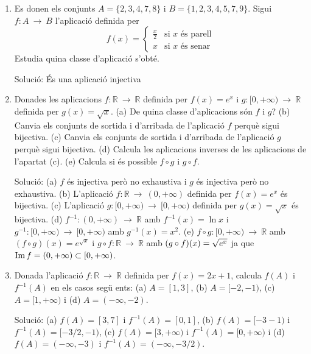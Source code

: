 \begin{enumerate}
\item Es donen els conjunts $A=\{2,3,4,7,8\}$ i $B=\{1,2,3,4,5,7,9\}$. Sigui
$f:A~\longrightarrow ~B$ l'aplicaci\'{o} definida per
\begin{equation*}
f(x)=\left\{
\begin{array}{ll}
\frac{x}{2} & \text{si \ }x\text{ \ \'{e}s parell} \\
x & \text{si \ }x\text{ \ \'{e}s senar}%
\end{array}%
\right.
\end{equation*}%
Estudia quina classe d'aplicaci\'{o} s'obt\'{e}.

Soluci\'{o}: \'{E}s una aplicaci\'{o} injectiva

\item Donades les aplicacions $f:\mathbb{R}~\longrightarrow ~\mathbb{R}$
definida per $f(x)=e^{x}$ i $g:[0,+\infty )~\longrightarrow ~\mathbb{R}$
definida per $g(x)=\sqrt{x}$. (a) De quina classe d'aplicacions s\'{o}n $f$
i $g$? (b) Canvia els conjunts de sortida i d'arribada de l'aplicaci\'{o} $f$
perqu\`{e} sigui bijectiva. (c) Canvia els conjunts de sortida i d'arribada
de l'aplicaci\'{o} $g$ perqu\`{e} sigui bijectiva. (d) Calcula les
aplicacions inverses de les aplicacions de l'apartat (c). (e) Calcula si
\'{e}s possible $f\circ g$ i $g\circ f$.

Soluci\'{o}: (a) $f$ \'{e}s injectiva per\`{o} no exhaustiva i $g$ \'{e}s
injectiva per\`{o} no exhaustiva. (b) L'aplicaci\'{o} $f:\mathbb{R}%
~\longrightarrow ~(0,+\infty )$ definida per $f(x)=e^{x}$ \'{e}s bijectiva.
(c) L'aplicaci\'{o} $g:[0,+\infty )~\longrightarrow ~[0,+\infty )$ definida
per $g(x)=\sqrt{x}$ \'{e}s bijectiva. (d) $f^{-1}:(0,+\infty
)~\longrightarrow ~\mathbb{R}$ amb $f^{-1}(x)=\ln x$ i $g^{-1}:[0,+\infty
)~\longrightarrow ~[0,+\infty )$ amb $g^{-1}(x)=x^{2}$. (e) $f\circ
g:[0,+\infty )~\longrightarrow ~\mathbb{R}$ amb $(f\circ g)(x)=e^{\sqrt{x}}$
i $g\circ f:\mathbb{R}~\longrightarrow ~\mathbb{R}$ amb $(g\circ f)(x)=\sqrt{%
e^{x}}$ ja que $\mathop{\rm Im}\nolimits f=(0,+\infty )\subset \lbrack 0,+\infty )$.

\item Donada l'aplicaci\'{o} $f:\mathbb{R}~\longrightarrow ~\mathbb{R}$
definida per $f(x)=2x+1$, calcula $f(A)$ i $f^{-1}(A)$ en els casos seg\"{u}%
ents: (a) $A=[1,3]$, (b) $A=[-2,-1)$, (c) $A=[1,+\infty )$ i (d) $A=(-\infty
,-2)$.

Soluci\'{o}: (a) $f(A)=[3,7]$ i $f^{-1}(A)=[0,1]$, (b) $f(A)=[-3-1)$ i $%
f^{-1}(A)=[-3/2,-1)$, (c) $f(A)=[3,+\infty )$ i $f^{-1}(A)=[0,+\infty )$ i
(d) $f(A)=(-\infty ,-3)$ i $f^{-1}(A)=(-\infty ,-3/2)$.


\end{enumerate}

